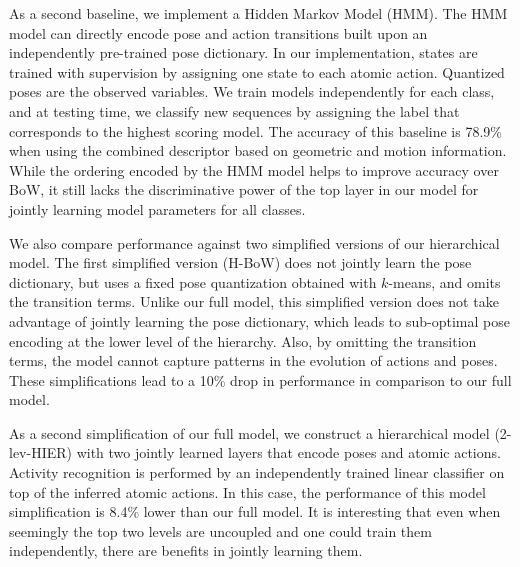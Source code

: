 As a second baseline, we implement a Hidden Markov Model (HMM).
The HMM model can directly encode pose and action transitions built
upon an independently pre-trained pose dictionary.
In our implementation, states are trained with supervision by assigning one
state to each atomic action. Quantized poses are the observed variables.
We train models independently for each class, and at testing time,
we classify new sequences by assigning the label that corresponds to the
highest scoring model. The accuracy of this
baseline is 78.9\% when using the combined
descriptor based on geometric and motion information. While the ordering encoded by the HMM model 
helps to improve accuracy over BoW,
it still lacks the discriminative power of the top layer in our model for
jointly learning model parameters for all classes. 


We also compare performance against two simplified versions of our hierarchical
model. The first simplified version (H-BoW) does not jointly
learn the pose dictionary, but uses a fixed pose quantization obtained with
$k$-means, and omits the transition terms.
Unlike our full model, this simplified version does not take advantage of
jointly learning the pose dictionary, which leads to sub-optimal
pose encoding at the lower level of the hierarchy.
Also, by omitting the transition terms, the model cannot capture patterns
in the evolution of actions and poses.
These simplifications lead to a 10\% drop in performance in comparison
to our full model.

As a second simplification of our full model, we construct a
hierarchical model (2-lev-HIER) with two jointly learned
layers that encode poses and atomic actions. Activity recognition
is performed by an independently trained linear
classifier on top of the inferred atomic actions.
In this case, the performance of this model simplification is 8.4\% lower
than our full model. It is interesting that even when seemingly the top two
levels are uncoupled and one could train them independently,
there are benefits in jointly learning them.


